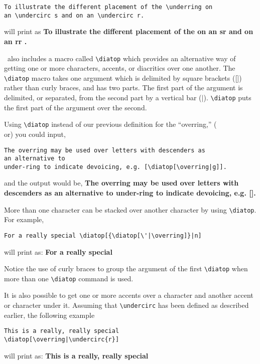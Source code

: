 \begin{verbatim}
To illustrate the different placement of the \underring on
an \undercirc s and on an \undercirc r.
\end{verbatim}

\noindent will print as
\vs{5pt}
{\def\undercirc#1{\ifx#1r
     \oalign{#1\crcr\hidewidth\kern.24em\underring\hidewidth\crcr}\fi}
\bf To illustrate the different placement of the \underring on an \undercirc s
and on an \undercirc r.
}
\vs{5pt}

\ipam\
also includes a macro called \verb?\diatop? which provides an alternative way
of getting one or more characters, accents, or diacritics over one another. The
\verb?\diatop? macro takes one argument which is delimited by square
brackets ([])
rather than curly braces, and has two parts. The first part of the
argument is delimited, or separated, from the second part by a vertical bar
($\vert$). \verb?\diatop? puts the first part of the argument over the second.

Using \verb?\diatop? instead of our previous definition for the ``overring,'' (\\or)
you could input,

\begin{verbatim}
The overring may be used over letters with descenders as
an alternative to
under-ring to indicate devoicing, e.g. [\diatop[\overring|g]].
\end{verbatim}
\noindent and the output would be,
\vs{5pt}
{\bf The overring may be used over letters with descenders as an alternative to
under-ring to indicate devoicing, e.g. [\diatop[\overring|g]].
}
\vs{5pt}

More than one character can be stacked over another character by using
\verb?\diatop?. For example,

\begin{verbatim}
For a really special \diatop[{\diatop[\'|\overring]}|n]
\end{verbatim}
\noindent will print as:
\vs{5pt}
{\bf For a really special \diatop[{\diatop[\'|\overring]}|n]
}
\vs{5pt}

\noindent Notice the use of curly braces to group the argument of the first
\verb?\diatop? when more than one \verb?\diatop? command is used.

It is also possible to get one or more accents over a character and another
accent or character under it. Assuming that \verb?\undercirc? has been defined as
described earlier, the following example

\begin{verbatim}
This is a really, really special
\diatop[\overring|\undercirc{r}]
\end{verbatim}
\noindent will print as:
\vs{5pt}
{\def\undercirc#1{\oalign{#1\crcr\hidewidth\underring\hidewidth}}
\bf This is a really, really special \diatop[\overring|\undercirc{r}]
}
\vs{5pt}

